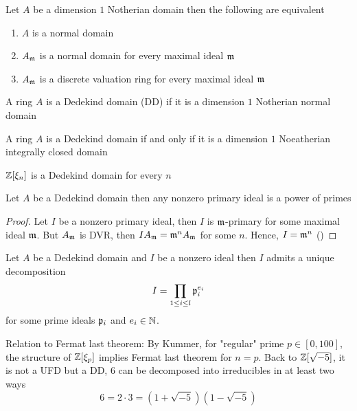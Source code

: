 \begin{proposition}
	Let $A$ be a dimension $1$ Notherian domain then the following are equivalent
	\begin{enumerate}
		\item $A$ is a normal domain
		\item $A_{\mathfrak{m}}$ is a normal domain for every maximal ideal $\mathfrak{m}$
		\item $A_{\mathfrak{m}}$ is a discrete valuation ring for every maximal ideal $\mathfrak{m}$
	\end{enumerate}
\end{proposition}

\begin{definition}
	A ring $A$ is a Dedekind domain (DD) if it is a dimension $1$ Notherian normal domain
\end{definition}

\begin{remark}
	A ring $A$ is a Dedekind domain if and only if it is a dimension $1$ Noeatherian integrally closed domain
\end{remark}

\begin{remark}
	$\mathbb{Z}[\xi_n]$ is a Dedekind domain for every $n$
\end{remark}

\begin{proposition}
	Let $A$ be a Dedekind domain then any nonzero primary ideal is a power of primes
\end{proposition}

\begin{proof}
	Let $I$ be a nonzero primary ideal, then $I$ is $\mathfrak{m}$-primary for some maximal ideal $\mathfrak{m}$. But $A_{\mathfrak{m}}$ is DVR, then $I A_{\mathfrak{m}} = \mathfrak{m}^n A_{\mathfrak{m}}$ for some $n$. Hence, $I = \mathfrak{m}^n$ ()
\end{proof}

\begin{theorem}
	Let $A$ be a Dedekind domain and $I$ be a nonzero ideal then $I$ admits a unique decomposition
	$$
		I = \prod_{1 \leq i \leq l} \mathfrak{p}_i^{e_i}
	$$
	for some prime ideals $\mathfrak{p}_i$ and $e_i \in \mathbb{N}$.
	
\end{theorem}

Relation to Fermat last theorem: By Kummer, for "regular" prime $p \in [0, 100]$, the structure of $\mathbb{Z}[\xi_p]$ implies Fermat last theorem for $n = p$. Back to $\mathbb{Z}[\sqrt{-5}]$, it is not a UFD but a DD, $6$ can be decomposed into irreducibles in at least two ways
$$
	6 = 2 \cdot 3 = (1 + \sqrt{-5})(1 - \sqrt{-5})
$$

